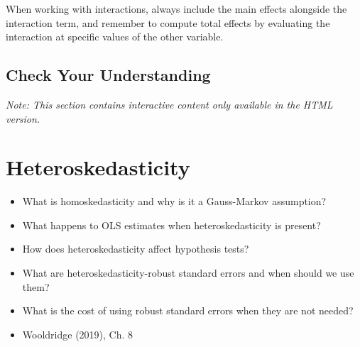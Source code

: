 \documentclass[
  letterpaper,
  DIV=11,
  numbers=noendperiod]{scrreprt}
\providecommand{\tightlist}{%
  \setlength{\itemsep}{0pt}\setlength{\parskip}{0pt}}
\begin{document}
When working with interactions, always include the main effects
alongside the interaction term, and remember to compute total effects by
evaluating the interaction at specific values of the other variable.

\section{Check Your Understanding}\label{check-your-understanding-6}

\emph{Note: This section contains interactive content only available in
the HTML version.}


\chapter{Heteroskedasticity}\label{sec-heteroskedasticity}

\begin{tcolorbox}[enhanced jigsaw, arc=.35mm, bottomrule=.15mm, bottomtitle=1mm, breakable, colback=white, colbacktitle=quarto-callout-tip-color!10!white, colframe=quarto-callout-tip-color-frame, coltitle=black, left=2mm, leftrule=.75mm, opacityback=0, opacitybacktitle=0.6, rightrule=.15mm, title=\textcolor{quarto-callout-tip-color}{\faLightbulb}\hspace{0.5em}{\textbf{Key Questions}}, titlerule=0mm, toprule=.15mm, toptitle=1mm]

\begin{itemize}
\tightlist
\item
  What is homoskedasticity and why is it a Gauss-Markov assumption?
\item
  What happens to OLS estimates when heteroskedasticity is present?
\item
  How does heteroskedasticity affect hypothesis tests?
\item
  What are heteroskedasticity-robust standard errors and when should we
  use them?
\item
  What is the cost of using robust standard errors when they are not
  needed?
\end{itemize}

\end{tcolorbox}

\begin{tcolorbox}[enhanced jigsaw, arc=.35mm, bottomrule=.15mm, bottomtitle=1mm, breakable, colback=white, colbacktitle=quarto-callout-note-color!10!white, colframe=quarto-callout-note-color-frame, coltitle=black, left=2mm, leftrule=.75mm, opacityback=0, opacitybacktitle=0.6, rightrule=.15mm, title=\textcolor{quarto-callout-note-color}{\faInfo}\hspace{0.5em}{\textbf{Suggested Readings}}, titlerule=0mm, toprule=.15mm, toptitle=1mm]

\begin{itemize}
\tightlist
\item
  Wooldridge (2019), Ch. 8
\end{itemize}

\end{tcolorbox}
\end{document}
